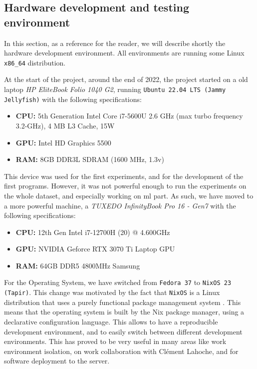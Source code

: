     \subsection{Hardware development and testing environment}
    In this section, as a reference for the reader, we will describe shortly the hardware development environment. All environments are running some Linux \texttt{x86\_64} distribution.

    At the start of the project, around the end of 2022, the project started on a old laptop \textit{HP EliteBook Folio 1040 G2}, running \texttt{Ubuntu 22.04 LTS (Jammy Jellyfish)} with the following specifications:

    \begin{itemize}
        \item \textbf{CPU:} 5th Generation Intel Core i7-5600U 2.6 GHz (max turbo frequency 3.2-GHz), 4 MB L3 Cache, 15W
        \item \textbf{GPU:} Intel HD Graphics 5500
        \item \textbf{RAM:} 8GB DDR3L SDRAM (1600 MHz, 1.3v)
    \end{itemize}

    This device was used for the first experiments, and for the development of the first programs. However, it was not powerful enough to run the experiments on the whole dataset, and especially working on \acrshort{ml} part. As such, we have moved to a more powerful machine, a \textit{TUXEDO InfinityBook Pro 16 - Gen7} with the following specifications:

    \begin{itemize}
        \item \textbf{CPU:} 12th Gen Intel i7-12700H (20) @ 4.600GHz
        \item \textbf{GPU:} NVIDIA Geforce RTX 3070 Ti Laptop GPU
        \item \textbf{RAM:} 64GB DDR5 4800MHz Samsung
    \end{itemize}

    For the Operating System, we have switched from \texttt{Fedora 37} to \texttt{NixOS 23 (Tapir)}. This change was motivated by the fact that \texttt{NixOS} is a Linux distribution that uses a purely functional package management system \cite{NixOS08}. This means that the operating system is built by the Nix package manager, using a declarative configuration language. This allows to have a reproducible development environment, and to easily switch between different development environments. This has proved to be very useful in many areas like work environment isolation, on work collaboration with Clément Lahoche, and for software deployment to the server.
    
